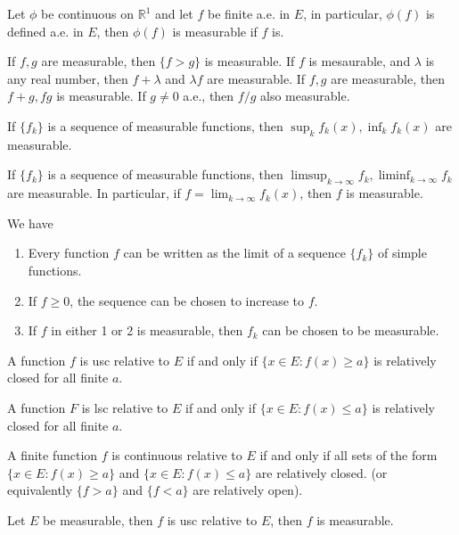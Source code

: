 \documentclass[openany]{book}
\newcommand{\R}{\mathbb{R}}
\begin{document}
\begin{thm}
    Let $\phi$ be continuous on $\R^1$ and let $f$ be finite a.e. in $E$, in particular, $\phi(f)$ is defined a.e. in $E$, then $\phi(f)$ is measurable if $f$ is.
\end{thm}
\begin{prop}
    If $f,g$ are measurable, then $\{f>g\}$ is measurable. If $f$ is mesaurable, and $\lambda$ is any real number, then $f+\lambda$ and $\lambda f$ are measurable. If $f,g$ are measurable, then $f+g, fg$ is measurable. If $g\neq 0$ a.e., then $f/g$ also measurable. 

    If $\{f_k\}$ is a sequence of measurable functions, then $\sup_kf_k(x), \inf_kf_k(x)$ are measurable.
\end{prop}
\begin{prop}
    If $\{f_k\}$ is a sequence of measurable functions, then $\limsup_{k\to\infty}f_k, \liminf_{k\to\infty}f_k$ are measurable. In particular, if $f=\lim_{k\to\infty}f_k(x)$, then $f$ is measurable.
\end{prop}
\begin{prop}
    We have 
    \begin{enumerate}
        \item Every function $f$ can be written as the limit of a sequence $\{f_k\}$ of simple functions.
        \item If $f\geq 0$, the sequence can be chosen to increase to $f$.
        \item If $f$ in either 1 or 2 is measurable, then $f_k$ can be chosen to be measurable.
    \end{enumerate}
\end{prop}
\begin{prop}
    A function $f$ is usc relative to $E$ if and only if $\{x\in E: f(x)\geq a\}$ is relatively closed for all finite $a$.

    A function $F$ is lsc relative to $E$ if and only if $\{x\in E: f(x)\leq a\}$ is relatively closed for all finite $a$.
\end{prop}
\begin{prop}
    A finite function $f$ is continuous relative to $E$ if and only if all sets of the form $\{x\in E: f(x)\geq a\}$ and $\{x\in E:f(x)\leq a\}$ are relatively closed. (or equivalently $\{f>a\}$ and $\{f<a\}$ are relatively open).
\end{prop}
\begin{prop}
    Let $E$ be measurable, then $f$ is usc relative to $E$, then $f$ is measurable.
\end{prop}
\end{document}
